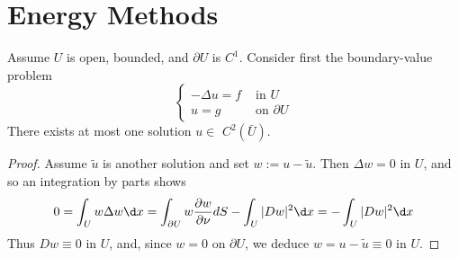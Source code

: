 \section{Energy Methods} %
\begin{theorem}[Uniqueness]
    Assume $U$ is open, bounded, and $\partial U$ is $C^1$.
    Consider first the boundary-value problem
    \begin{equation*}
        \left\{\begin{aligned}
            -\Delta u=f & \text { in } U          \\
            u=g         & \text { on } \partial U
        \end{aligned}\right.
        \tag{1}
    \end{equation*}
    There exists at most one solution $u \in$ $C^2(\bar{U})$.
    \begin{proof}
        Assume $\tilde{u}$ is another solution and set $w:=u-\tilde{u}$.
        Then $\Delta w=0$ in $U$, and so an integration by parts shows
        \begin{equation*}
            0=
            \int_U w \Delta w \d x
            =
            \int_{\partial U} w \frac{\partial w}{\partial \nu} dS
            -\int_U|D w|^2 \d x
            =-\int_U|D w|^2 \d x
        \end{equation*}
        Thus $D w \equiv 0$ in $U$, and, since $w=0$ on $\partial U$, we deduce $w=u-\tilde{u} \equiv 0$ in $U$.
    \end{proof}

\end{theorem}
